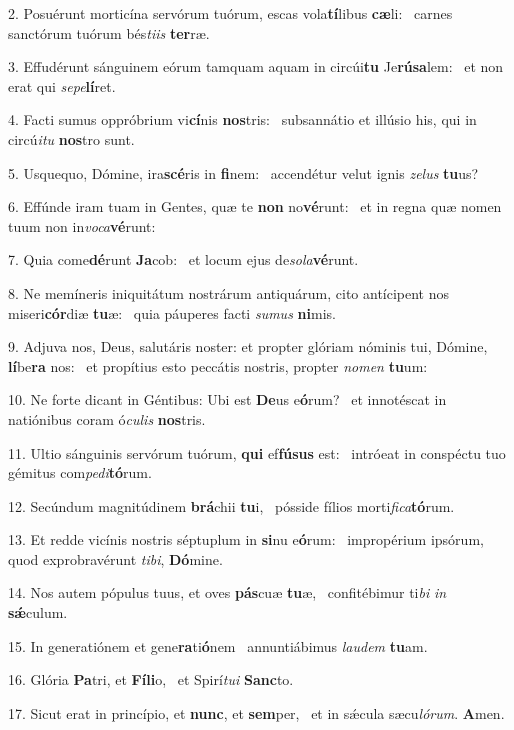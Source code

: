 2. Posuérunt morticína servórum tuórum, escas vola\textbf{tí}libus \textbf{cæ}li: \ast\  carnes sanctórum tuórum bés\textit{ti}\textit{is} \textbf{ter}ræ.\

3. Effudérunt sánguinem eórum tamquam aquam in circúi\textbf{tu} Je\textbf{rú}\textbf{sa}lem: \ast\  et non erat qui \textit{se}\textit{pe}\textbf{lí}ret.\

4. Facti sumus oppróbrium vi\textbf{cí}nis \textbf{nos}tris: \ast\  subsannátio et illúsio his, qui in circú\textit{i}\textit{tu} \textbf{nos}tro sunt.\

5. Usquequo, Dómine, ira\textbf{scé}ris in \textbf{fi}nem: \ast\  accendétur velut ignis \textit{ze}\textit{lus} \textbf{tu}us?\

6. Effúnde iram tuam in Gentes, quæ te \textbf{non} no\textbf{vé}runt: \ast\  et in regna quæ nomen tuum non in\textit{vo}\textit{ca}\textbf{vé}runt:\

7. Quia come\textbf{dé}runt \textbf{Ja}cob: \ast\  et locum ejus de\textit{so}\textit{la}\textbf{vé}runt.\

8. Ne memíneris iniquitátum nostrárum antiquárum, cito antícipent nos miseri\textbf{cór}diæ \textbf{tu}æ: \ast\  quia páuperes facti \textit{su}\textit{mus} \textbf{ni}mis.\

9. Adjuva nos, Deus, salutáris noster: et propter glóriam nóminis tui, Dómine, \textbf{lí}be\textbf{ra} nos: \ast\  et propítius esto peccátis nostris, propter \textit{no}\textit{men} \textbf{tu}um:\

10. Ne forte dicant in Géntibus: Ubi est \textbf{De}us e\textbf{ó}rum? \ast\  et innotéscat in natiónibus coram ó\textit{cu}\textit{lis} \textbf{nos}tris.\

11. Ultio sánguinis servórum tuórum, \textbf{qui} ef\textbf{fú}\textbf{sus} est: \ast\  intróeat in conspéctu tuo gémitus com\textit{pe}\textit{di}\textbf{tó}rum.\

12. Secúndum magnitúdinem \textbf{brá}chii \textbf{tu}i, \ast\  pósside fílios morti\textit{fi}\textit{ca}\textbf{tó}rum.\

13. Et redde vicínis nostris séptuplum in \textbf{si}nu e\textbf{ó}rum: \ast\  impropérium ipsórum, quod exprobravérunt \textit{ti}\textit{bi}, \textbf{Dó}mine.\

14. Nos autem pópulus tuus, et oves \textbf{pás}cuæ \textbf{tu}æ, \ast\  confitébimur ti\textit{bi} \textit{in} \textbf{sǽ}culum.\

15. In generatiónem et gene\textbf{ra}ti\textbf{ó}nem \ast\  annuntiábimus \textit{lau}\textit{dem} \textbf{tu}am.\

16. Glória \textbf{Pa}tri, et \textbf{Fí}\textbf{li}o, \ast\  et Spirí\textit{tu}\textit{i} \textbf{Sanc}to.\

17. Sicut erat in princípio, et \textbf{nunc}, et \textbf{sem}per, \ast\  et in sǽcula sæcu\textit{ló}\textit{rum}. \textbf{A}men.\

